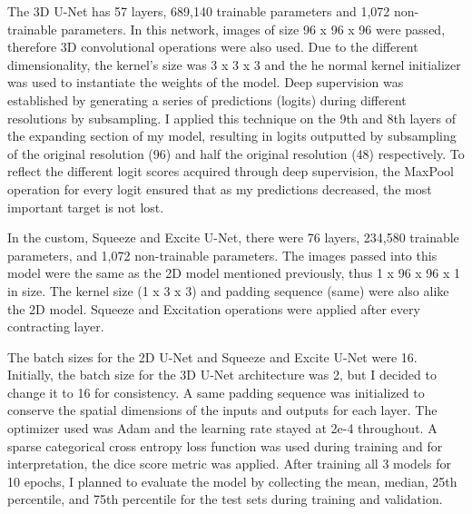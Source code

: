 \documentclass [12pt, letterpaper] {article}
\begin{document}
The 3D U-Net has 57 layers, 689,140 trainable parameters and 1,072 non-trainable parameters. In this network, images of size 96 x 96 x 96 were passed, therefore 3D convolutional operations were also used. Due to the different dimensionality, the kernel's size was 3 x 3 x 3 and the he normal kernel initializer was used to instantiate the weights of the model. Deep supervision was established by generating a series of predictions (logits) during different resolutions by subsampling. I applied this technique on the 9th and 8th layers of the expanding section of my model, resulting in logits outputted by subsampling of the original resolution (96) and half the original resolution (48) respectively. To reflect the different logit scores acquired through deep supervision, the MaxPool operation for every logit ensured that as my predictions decreased, the most important target is not lost. 

In the custom, Squeeze and Excite U-Net, there were 76 layers, 234,580 trainable parameters, and 1,072 non-trainable parameters. The images passed into this model were the same as the 2D model mentioned previously, thus 1 x 96 x 96 x 1 in size. The kernel size (1 x 3 x 3) and padding sequence (same) were also alike the 2D model. Squeeze and Excitation operations were applied after every contracting layer. 

The batch sizes for the 2D U-Net and Squeeze and Excite U-Net were 16. Initially, the batch size for the 3D U-Net architecture was 2, but I decided to change it to 16 for consistency. A same padding sequence was initialized to conserve the spatial dimensions of the inputs and outputs for each layer. The optimizer used was Adam and the learning rate stayed at 2e-4 throughout. A sparse categorical cross entropy loss function was used during training and for interpretation, the dice score metric was applied.  After training all 3 models for 10 epochs, I planned to evaluate the model by collecting the mean, median, 25th percentile, and 75th percentile for the test sets during training and validation. 
\end{document}
